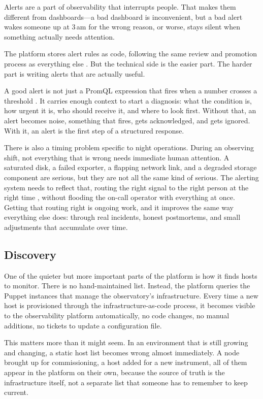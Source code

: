 Alerts are a part of observability that interrupts people. That makes them different from
dashboards---a bad dashboard is inconvenient, but a bad alert wakes someone up at 3\,am for the
wrong reason, or worse, stays silent when something actually needs attention.

The platform stores alert rules as code, following the same review and promotion process as
everything else \cite{lsst-it-k8s-cookbook,prometheus-alerting,prometheus-alertmanager}. But the
technical side is the easier part. The harder part is writing alerts that are actually useful.

A good alert is not just a PromQL expression that fires when a number crosses a threshold
\cite{prometheus-alerting,prometheus-alertmanager}. It carries enough context to start a diagnosis:
what the condition is, how urgent it is, who should receive it, and where to look first. Without
that, an alert becomes noise, something that fires, gets acknowledged, and gets ignored. With it,
an alert is the first step of a structured response.

There is also a timing problem specific to night operations. During an observing shift, not
everything that is wrong needs immediate human attention. A saturated disk, a failed exporter, a
flapping network link, and a degraded storage component are serious, but they are not all the same
kind of serious. The alerting system needs to reflect that, routing the right signal to the right
person at the right time \cite{prometheus-alertmanager}, without flooding the on-call operator with
everything at once. Getting that routing right is ongoing work, and it improves the same way
everything else does: through real incidents, honest postmortems, and small adjustments that
accumulate over time.

\subsection{Discovery}

One of the quieter but more important parts of the platform is how it finds hosts to monitor.
There is no hand-maintained list. Instead, the platform queries the Puppet instances that manage
the observatory's infrastructure. Every time a new host is provisioned through the
infrastructure-as-code process, it becomes visible to the observability platform automatically, no
code changes, no manual additions, no tickets to update a configuration file.

This matters more than it might seem. In an environment that is still growing and changing, a
static host list becomes wrong almost immediately. A node brought up for commissioning, a host
added for a new instrument, all of them appear in the platform on their own, because the source of
truth is the infrastructure itself, not a separate list that someone has to remember to keep
current.

